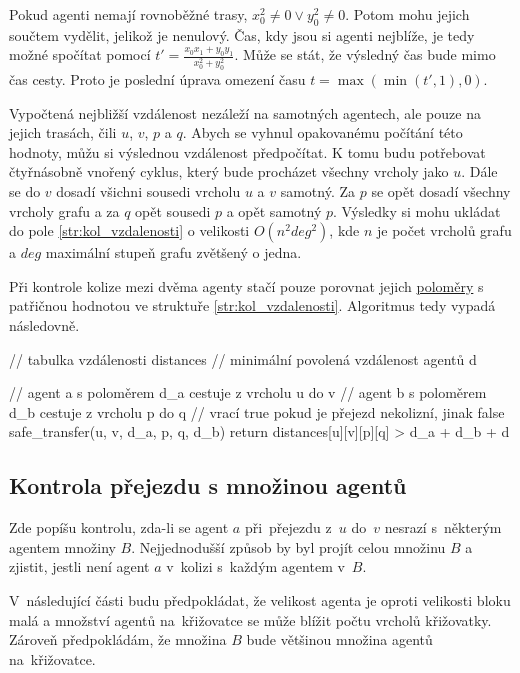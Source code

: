 Pokud agenti nemají rovnoběžné trasy, $x^2_0 \neq 0 \vee y^2_0 \neq 0$.
Potom mohu jejich součtem vydělit, jelikož je nenulový.
Čas, kdy jsou si agenti nejblíže, je tedy možné spočítat pomocí $t' = \frac{x_0 x_1 + y_0 y_1}{x^2_0 + y^2_0}$.
Může se stát, že výsledný čas bude mimo čas cesty.
Proto je poslední úprava omezení času $t = \max(\min(t', 1), 0)$.

Vypočtená nejbližší vzdálenost nezáleží na samotných agentech, ale pouze na jejich trasách, čili $u$, $v$, $p$ a $q$.
Abych se vyhnul opakovanému počítání této hodnoty, můžu si výslednou vzdálenost předpočítat.
K tomu budu potřebovat čtyřnásobně vnořený cyklus, který bude procházet všechny vrcholy jako $u$.
Dále se do $v$ dosadí všichni sousedi vrcholu $u$ a $v$ samotný.
Za $p$ se opět dosadí všechny vrcholy grafu a za $q$ opět sousedi $p$ a opět samotný $p$.
Výsledky si mohu ukládat do pole \ref{str:kol_vzdalenosti}
o velikosti $O(n^2 deg^2)$, kde $n$ je počet vrcholů grafu a $deg$ maximální stupeň grafu zvětšený o jedna.

Při kontrole kolize mezi dvěma agenty stačí pouze porovnat jejich \hyperref[par:polomer_agent]{poloměry}
s patřičnou hodnotou ve struktuře \ref{str:kol_vzdalenosti}.
Algoritmus tedy vypadá následovně.
\begin{code}[fontsize=\footnotesize]
// tabulka vzdálenosti distances
// minimální povolená vzdálenost agentů d

// agent a s poloměrem d_a cestuje z vrcholu u do v
// agent b s poloměrem d_b cestuje z vrcholu p do q
// vrací true pokud je přejezd nekolizní, jinak false
safe_transfer(u, v, d_a, p, q, d_b)
	return distances[u][v][p][q] > d_a + d_b + d
\end{code}

\subsection{Kontrola přejezdu s množinou agentů}\label{subsec:kontrola_prejezdu_mnozina_agentu}

Zde popíšu kontrolu, zda-li se agent $a$ při~přejezdu z~$u$ do~$v$ nesrazí s~některým agentem množiny $B$.
Nejjednodušší způsob by byl projít celou množinu $B$ a zjistit, jestli není agent $a$ v~kolizi s~každým agentem v~$B$.

V~následující části budu předpokládat, že velikost agenta je oproti velikosti bloku malá a
množství agentů na~křižovatce se může blížit počtu vrcholů křižovatky.
Zároveň předpokládám, že množina $B$ bude většinou množina agentů na~křižovatce.

